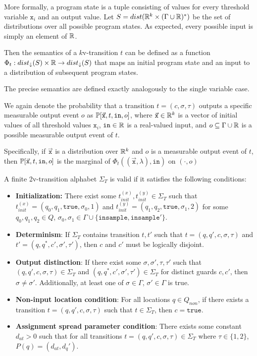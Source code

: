 More formally, a program state is a tuple consisting of values for every threshold variable $\texttt{x}_i$ and an output value. Let $S = dist(\mathbb{R}^k\times (\Gamma\cup \mathbb{R})^*)$ be the set of distributions over all possible program states. As expected, every possible input is simply an element of $\mathbb{R}$. 

Then the semantics of a $k$v-transition $t$ can be defined as a function $\Phi_t: dist_\downarrow(S)\times \mathbb{R}\to dist_\downarrow(S)$ that maps an initial program state and an input to a distribution of subsequent program states.

The precise semantics are defined exactly analogously to the single variable case. 

We again denote the probability that a transition $t=(c, \sigma, \tau)$ outputs a specific measurable output event $o$ as $\mathbb{P}[\vec{\texttt{x}}, t, \texttt{in}, o]$, where $\vec{\texttt{x}}\in \mathbb{R}^k$ is a vector of initial values of all threshold values $\texttt{x}_i$, $\texttt{in}\in \mathbb{R}$ is a real-valued input, and $o\subseteq \Gamma\cup\mathbb{R}$ is a possible measurable output event of $t$.

Specifically, if $\vec{\texttt{x}}$ is a distribution over $\mathbb{R}^k$ and $o$ is a measurable output event of $t$, then $\mathbb{P}[\vec{\texttt{x}}, t, \texttt{in}, o]$ is the marginal of $\Phi_t((\vec{\texttt{x}}, \lambda), \texttt{in})$ on $(\cdot, o)$

\begin{defn}
    A finite 2v-transition alphabet $\Sigma_T$ is valid if it satisfies the following conditions: 
    \begin{itemize}
        \item \textbf{Initialization:} There exist some $t_{init}^{(x)}, t_{init}^{(y)}\in \Sigma_T$ such that $t_{init}^{(x)} = (q_0, q_1, \texttt{true}, \sigma_0, 1)$ and $t_{init}^{(y)} = (q_1, q_2, \texttt{true}, \sigma_1, 2)$ for some $q_0, q_1, q_2\in Q$, $\sigma_0, \sigma_1 \in \Gamma\cup\{\texttt{insample}, \texttt{insample}'\}$. 
        \item \textbf{Determinism}: If $\Sigma_T$ contains transition $t, t'$ such that $t=(q, q', c, \sigma, \tau)$ and $t'= (q, q^*, c', \sigma', \tau')$, then $c$ and $c'$ must be logically disjoint. 
        \item \textbf{Output distinction}: If there exist some $\sigma, \sigma', \tau, \tau'$ such that $(q, q', c, \sigma, \tau)\in \Sigma_T$  and $(q, q^*, c', \sigma', \tau') \in \Sigma_T$ for distinct guards $c, c'$, then $\sigma \neq \sigma'$. Additionally, at least one of $\sigma\in \Gamma$, $\sigma'\in \Gamma$ is true.
        \item \textbf{Non-input location condition}: For all locations $q\in Q_{non}$, if there exists a transition $t=(q, q', c, \sigma, \tau)$ such that $t\in \Sigma_T$, then $c = \texttt{true}$.
        \item \textbf{Assignment spread parameter condition}: There exists some constant $d_{at}>0$ such that for all transitions $t = (q, q', c, \sigma, \tau)\in \Sigma_T$ where $\tau \in \{1, 2\}$, $P(q) = (d_{at}, d_q')$.
    \end{itemize}
\end{defn}

